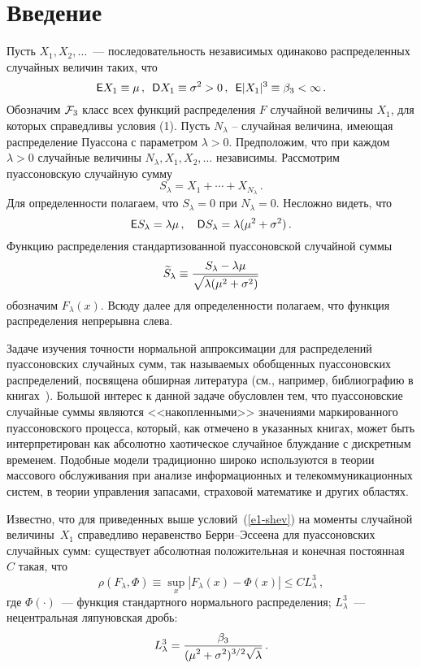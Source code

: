       \begin{multicols}{2}
      
            \label{st\stat}

  \section{Введение}
  
  Пусть $X_1, X_2, \ldots$~--- последовательность независимых
одинаково распределенных случайных величин таких, что
\begin{equation}
{{\sf E}}X_1\equiv\mu\,, \enskip {{\sf D}}X_1 \equiv \sigma^2>0\,, \enskip
{{\sf E}}|X_1|^{3} \equiv \beta_{3}<\infty\,. \label{e1-shev}
\end{equation}
Обозначим ${\mathcal F}_3$ класс всех функций распределения $F$ случайной
величины $X_1$, для которых справедливы условия (1). Пусть
$N_\lambda$ -- случайная величина, имеющая распределение Пуассона с
параметром $\lambda>0.$ Предположим, что при каждом $\lambda>0$
случайные величины $N_\lambda, X_1, X_2,\ldots$ независимы.
  Рассмотрим пуассоновскую случайную сумму
$$
S_{\lambda} = X_1+\cdots+ X_{N_\lambda}\,.
$$
Для определенности полагаем, что $S_\lambda = 0$ при $N_\lambda =
0.$ Несложно видеть, что
$$
{{\sf E}}S_\lambda = \lambda\mu\,, \quad {{\sf D}}S_\lambda = \lambda(\mu^2+\sigma^2)\,.
$$
Функцию распределения стандартизованной пуассоновской случайной
суммы
$$
\widetilde{S}_\lambda \equiv\displaystyle\frac{\displaystyle S_\lambda-\lambda\mu\mathstrut}{\displaystyle \sqrt{\lambda(\mu^2+\sigma^2)}\mathstrut}
$$
обозначим $F_\lambda(x).$ Всюду далее для определенности полагаем,
что функция распределения непрерывна слева.

\columnbreak

Задаче изучения точности нормальной ап\-прок\-си\-ма\-ции для
распределений пуассоновских слу\-чайных сумм, так называемых
обобщенных пуассоновских распределений, посвящена обширная\linebreak
литература (см., например, библиографию в книгах~\cite{BeningKorolev2002, KBS2007}). Большой интерес к данной задаче
обуслов\-лен тем, что пуассоновские случайные суммы являются
<<накопленными>> значениями маркированного пуассоновского
процесса, который, как отмечено в указанных книгах, может быть
интерпретирован как абсолютно хаотическое случайное блуждание с
дискретным временем. Подобные модели традиционно широко
используются в теории массового обслуживания при анализе
информационных и телекоммуникационных систем, в теории управ\-ле\-ния
запасами, страховой математике и других областях.

Известно, что для приведенных выше условий~(\ref{e1-shev}) на моменты
случайной величины~$X_1$ справедливо неравенство Бер\-ри--Эс\-се\-ена
для пуассоновских случайных сумм: существует абсолютная
положительная и конечная постоянная~$C$ такая, что
\begin{equation}
\rho(F_\lambda,\Phi) \equiv \sup_x\left|F_\lambda(x) -
\Phi(x)\right|\le C  L_\lambda^3\,, 
\label{e2-shev}
\end{equation}
где $\Phi(\cdot)$~--- функция стандартного нормального распределения; $L_\lambda^3$~---
нецентральная ляпуновская дробь:
$$
L_\lambda^3=\displaystyle\frac{\displaystyle \beta_3\mathstrut}{\displaystyle (\mu^2+\sigma^2)^{3/2}\sqrt{\lambda}\mathstrut}\,.
$$



\end{multicols}
